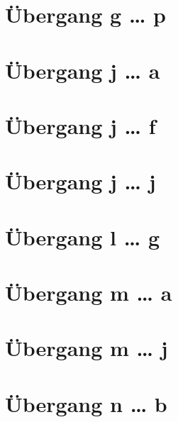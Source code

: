 \documentclass[a4paper,landscape]{article}
\begin{document}
\hspace*{-1ex}
\newpage

\section{Übergang g … p }

\hspace*{-1ex}
\newpage

\section{Übergang j … a }

\hspace*{-1ex}
\newpage

\section{Übergang j … f }

\hspace*{-1ex}
\newpage

\section{Übergang j … j }

\hspace*{-1ex}
\newpage

\section{Übergang l … g }

\hspace*{-1ex}
\newpage

\section{Übergang m … a }

\hspace*{-1ex}
\newpage

\section{Übergang m … j }

\hspace*{-1ex}
\newpage

\section{Übergang n … b }
\end{document}
